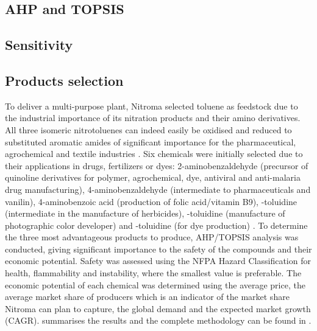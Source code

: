 
\subsection{AHP and TOPSIS} %


\subsection{Sensitivity} %

\subsection{Products selection}

To deliver a multi-purpose plant, Nitroma selected toluene as feedstock due to the industrial importance of its nitration products and their amino derivatives. All three isomeric nitrotoluenes can indeed easily be oxidised and reduced to substituted aromatic amides of significant importance for the pharmaceutical, agrochemical and textile industries \cite{dugal_nitrobenzene_2005}. Six chemicals were initially selected due to their applications in drugs, fertilizers or dyes: 2-aminobenzaldehyde (precursor of quinoline derivatives for polymer, agrochemical, dye, antiviral and anti-malaria drug manufacturing), 4-aminobenzaldehyde (intermediate to pharmaceuticals and vanilin), 4-aminobenzoic acid (production of folic acid/vitamin B9), \ortho-toluidine (intermediate in the manufacture of herbicides), \meta-toluidine (manufacture of  photographic color developer) and \para-toluidine (for dye production) \cite{bowers_toluidines_2000,bruhne_benzaldehyde_2011,maki_benzoic_2000}. To determine the three most advantageous products to produce, AHP/TOPSIS analysis was conducted, giving significant importance to the safety of the compounds and their economic potential. Safety was assessed using the NFPA Hazard Classification for health, flammability and instability, where the smallest value is preferable. The economic potential of each chemical was determined using the average price, the average market share of producers which is an indicator of the market share Nitroma can plan to capture, the global demand and the expected market growth (CAGR).  summarises the results and the complete methodology can be found in .   



